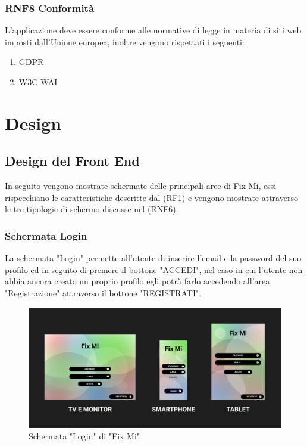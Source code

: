 \documentclass{report}
\begin{document}
\subsection*{RNF8 Conformità}
L'applicazione deve essere conforme alle normative di legge in materia di siti web imposti dall'Unione europea, inoltre vengono rispettati i seguenti:
\begin{enumerate}
	\item GDPR
	\item W3C WAI
\end{enumerate}
\chapter{Design}

\section{Design del Front End}

In seguito vengono mostrate schermate delle principali aree di Fix Mi, essi rispecchiano le caratteristiche descritte dal (RF1) e vengono mostrate attraverso le tre tipologie di schermo discusse nel (RNF6). 

\subsection*{Schermata Login}

La schermata "Login" permette all'utente di inserire l'email e la password del suo profilo ed in seguito di premere il bottone "ACCEDI", nel caso in cui l'utente non abbia ancora creato un proprio profilo egli potrà farlo accedendo all'area "Registrazione" attraverso il bottone "REGISTRATI".

\begin{figure}[H]
	\centering
	\includegraphics[width=1\textwidth]{images/Snapshots/login_snapshot.png}
	\caption{Schermata "Login" di "Fix Mi"}
\end{figure}	
\end{document}
